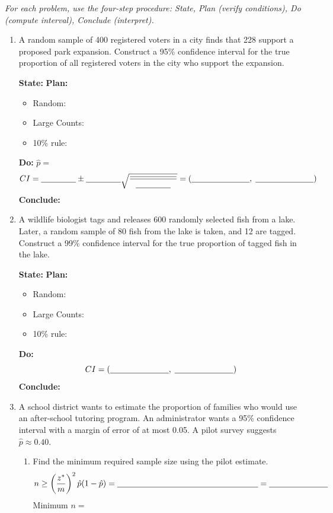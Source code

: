 \documentclass[10pt]{article}
\begin{document}
\namedateperiod

\vspace{0.15in}

\textit{For each problem, use the four-step procedure: State, Plan (verify conditions), Do (compute interval), Conclude (interpret).}

\begin{enumerate}

  \item A random sample of 400 registered voters in a city finds that 228 support a proposed
        park expansion. Construct a 95\% confidence interval for the true proportion of all
        registered voters in the city who support the expansion.

        \textbf{State:} 
        \textbf{Plan:}
        \begin{itemize}
          \item Random: \blank{7cm}
          \item Large Counts: \blank{7cm}
          \item 10\% rule: \blank{5cm}
        \end{itemize}
        \textbf{Do:} $\hat p = $ \blank{2cm}
        \[
          CI = \blank{1.5cm} \pm \blank{1.5cm}\sqrt{\frac{\blank{2cm}}{\blank{1.5cm}}}
             = (\blank{2.5cm},\; \blank{2.5cm})
        \]
        \textbf{Conclude:} 

  \item A wildlife biologist tags and releases 600 randomly selected fish from a lake.
        Later, a random sample of 80 fish from the lake is taken, and 12 are tagged.
        Construct a 99\% confidence interval for the true proportion of tagged fish in the lake.

        \textbf{State:} 
        \textbf{Plan:}
        \begin{itemize}
          \item Random: \blank{6cm}
          \item Large Counts: \blank{6cm}
          \item 10\% rule: \blank{5cm}
        \end{itemize}
        \textbf{Do:}
        \[
          CI = (\blank{2.5cm},\; \blank{2.5cm})
        \]
        \textbf{Conclude:} 

  \item A school district wants to estimate the proportion of families who would use
        an after-school tutoring program. An administrator wants a 95\% confidence interval
        with a margin of error of at most 0.05. A pilot survey suggests $\hat p \approx 0.40$.
        \begin{enumerate}[label=\alph*.]
          \item Find the minimum required sample size using the pilot estimate.
                \[n \ge \left(\frac{z^*}{m}\right)^2 \hat p(1-\hat p) = \blank{6cm} = \blank{2.5cm}\]
                Minimum $n = $ \blank{2cm}


\end{enumerate}
\end{enumerate}
\end{document}
